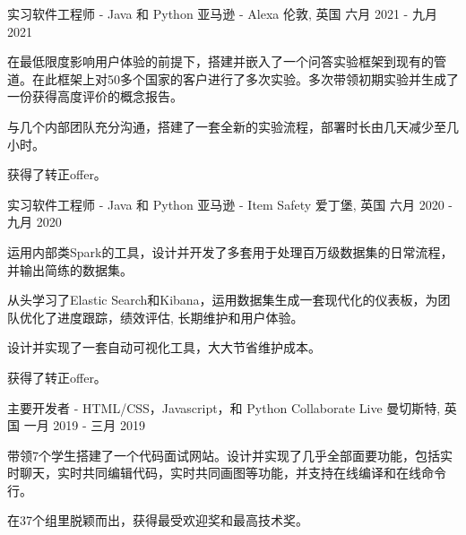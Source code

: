 

\begin{cventries}

  \cventry
    {实习软件工程师 - Java 和 Python} %
    {亚马逊 - Alexa} %
    {伦敦, 英国} %
    {六月 2021 - 九月 2021} %
    {
      \begin{cvitems} %
        \item {在最低限度影响用户体验的前提下，搭建并嵌入了一个问答实验框架到现有的管道。在此框架上对50多个国家的客户进行了多次实验。多次带领初期实验并生成了一份获得高度评价的概念报告。}
        \item {与几个内部团队充分沟通，搭建了一套全新的实验流程，部署时长由几天减少至几小时。}
        \item {获得了转正offer。}
      \end{cvitems}
    }

  \cventry
    {实习软件工程师 - Java 和 Python} %
    {亚马逊 - Item Safety} %
    {爱丁堡, 英国} %
    {六月 2020 - 九月 2020} %
    {
      \begin{cvitems} %
        \item {运用内部类Spark的工具，设计并开发了多套用于处理百万级数据集的日常流程，并输出简练的数据集。}
        \item {从头学习了Elastic Search和Kibana，运用数据集生成一套现代化的仪表板，为团队优化了进度跟踪，绩效评估, 长期维护和用户体验。}
        \item {设计并实现了一套自动可视化工具，大大节省维护成本。}
        \item {获得了转正offer。}
      \end{cvitems}
    }

  \cventry
    {主要开发者 - HTML/CSS，Javascript，和 Python} %
    {Collaborate Live} %
    {曼切斯特, 英国} %
    {一月 2019 - 三月 2019} %
    {
      \begin{cvitems} %
        \item {带领7个学生搭建了一个代码面试网站。设计并实现了几乎全部面要功能，包括实时聊天，实时共同编辑代码，实时共同画图等功能，并支持在线编译和在线命令行。}
        \item {在37个组里脱颖而出，获得最受欢迎奖和最高技术奖。}
      \end{cvitems}
    }
\end{cventries}
